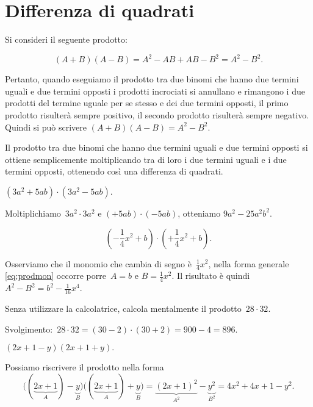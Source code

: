 \ovalbox{\risolvii \ref{ese:11.11}, \ref{ese:11.12}, \ref{ese:11.13}, \ref{ese:11.14}, \ref{ese:11.15}}

\section{Differenza di quadrati}\label{sect:differenza_di_quadrati}

Si consideri il seguente prodotto:

\begin{equation}\label{eq:prodmon}
 \left(A+B\right)\left(A-B\right)=A^{2}-{AB}+{AB}-B^{2}=A^{2}-B^{2}.
\end{equation}

Pertanto, quando eseguiamo il prodotto tra due binomi che hanno due
termini uguali e due termini opposti i prodotti incrociati si annullano
e rimangono i due prodotti del termine uguale per se stesso e dei due
termini opposti, il primo prodotto risulterà sempre positivo, il
secondo prodotto risulterà sempre negativo. Quindi si può scrivere
$\left(A+B\right)\left(A-B\right)=A^{2}-B^{2}$.

\osservazione Il prodotto tra due binomi che hanno due termini
uguali e due termini opposti si ottiene semplicemente moltiplicando tra
di loro i due termini uguali e i due termini opposti, ottenendo così una differenza di quadrati.

\begin{exrig}
 \begin{esempio}
$\left(3a^{2}+5{ab}\right)\cdot \left(3a^{2}-5{ab}\right).$

Moltiplichiamo~$3a^{2}\cdot 3a^{2}$ e
$\left(+5{ab}\right)\cdot\left(-5{ab}\right)$, otteniamo
$9a^{2}-25a^{2}b^{2}$.
 \end{esempio}

 \begin{esempio}
 \[\left(-{\frac{1}{4}}x^{2}+b\right)\cdot \left(+{\frac{1}{4}}x^{2}+b\right).\]

Osserviamo che il monomio che cambia di segno è~$\frac{1}{4}x^{2}$,
nella forma generale \eqref{eq:prodmon} occorre porre~$A=b$ e $B=\frac{1}{4}x^{2}$.
Il risultato è quindi~$A^{2}-B^{2}=b^{2}-\frac{1}{16}x^{4}$.
 \end{esempio}

 \begin{esempio}
 Senza utilizzare la calcolatrice, calcola mentalmente il prodotto~$28\cdot 32$.

Svolgimento:~$28\cdot 32=(30-2)\cdot(30+2)=900-4=896$.
 \end{esempio}

 \begin{esempio}
$(2x+1-y)(2x+1+y).$

Possiamo riscrivere il prodotto nella forma
\[\big((\underbrace{2x+1}_{A})-\underbrace{y}_{B}\big)\big((\underbrace{2x+1}_{A})+\underbrace{y}_{B}\big)=\underbrace{(2x+1)^{2}}_{A^{2}}-\underbrace{y^{2}}_{B^{2}}=4x^{2}+4x+1-y^{2}.\]
 \end{esempio}

\end{exrig}

